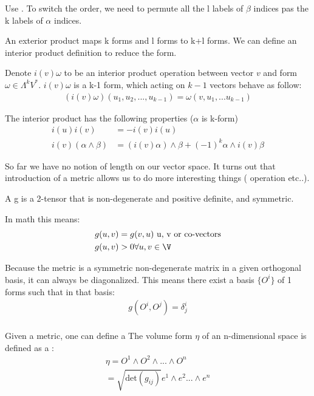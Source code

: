 \documentclass[11pt]{scrartcl}
\begin{document}
Use \cite{eq:2}.  To switch the order, we need to permute all the l labels of  $\beta$ indices pas the k labels of $\alpha$ indices.

An exterior product maps k forms and l forms to k+l forms.  We can define an interior product definition to reduce the form.

\begin{definition}
	Denote $i(v) \omega$ to be an interior product operation between vector $v$ and form $\omega \in \Lambda^k V^*$.  $i(v) \omega$ is a k-1 form, which acting on $k-1$ vectors behave as follow:
	\begin{align}
		(i(v) \omega) (u_1, u_2, ..., u_{k-1}) = \omega(v, u_1, ... u_{k-1})
	\end{align}
\end{definition}


\begin{lemma}
	The interior product has the following properties ($\alpha$ is k-form)
	\begin{align}
		i(u) i(v) &= -i(v) i(u) \\
		i(v) (\alpha \wedge \beta) &= ( i(v) \alpha) \wedge \beta + (-1)^k \alpha \wedge i(v) \beta
	\end{align}
\end{lemma}

So far we have no notion of length on our vector space.  It turns out that introduction of a metric allows us to do more interesting things ( operation etc..).

\begin{definition} A  g is a 2-tensor that is non-degenerate and positive definite, and symmetric.
\end{definition}

In math this means:
\begin{align}
	&g(u, v) = g(v, u) \text{ u, v or co-vectors} \\
	&g(u, v) > 0 \forall u, v \in \V
\end{align}

Because the metric is a symmetric non-degenerate matrix in a given orthogonal basis, it can always be diagonalized.   This means there exist a basis $\{ O^i \} $ of 1 forms such that in that basis:
\begin{align}
	g(O^i, O^j) = \delta^i_j \\
\end{align}

Given a metric, one can define a 
The volume form $\eta$ of an n-dimensional space is defined as a :
\begin{align}
	\eta = O^1 \wedge O^2 \wedge ... \wedge O^n \\
	= \sqrt{\text{det}(g_{ij})} e^1 \wedge e^2... \wedge e^n
\end{align}
\end{document}
